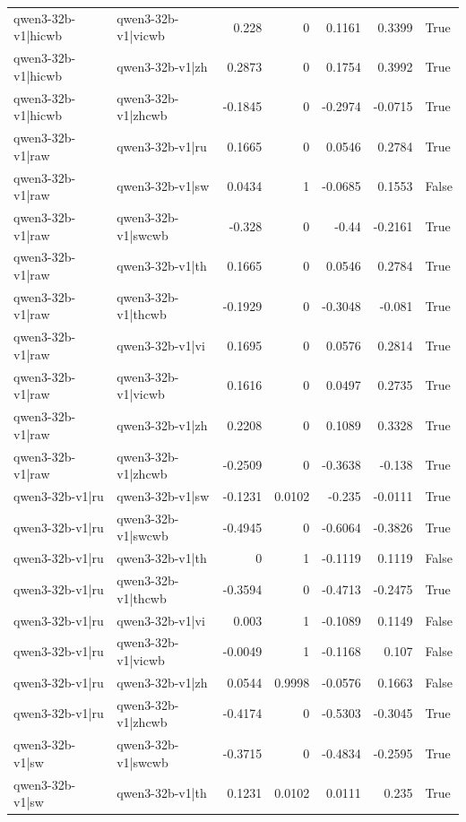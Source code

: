 \begin{table}
\begin{tabular}{l l r r r r l}
qwen3-32b-v1|hicwb & qwen3-32b-v1|vicwb & 0.228 & 0 & 0.1161 & 0.3399 & True \\
qwen3-32b-v1|hicwb & qwen3-32b-v1|zh & 0.2873 & 0 & 0.1754 & 0.3992 & True \\
qwen3-32b-v1|hicwb & qwen3-32b-v1|zhcwb & -0.1845 & 0 & -0.2974 & -0.0715 & True \\
qwen3-32b-v1|raw & qwen3-32b-v1|ru & 0.1665 & 0 & 0.0546 & 0.2784 & True \\
qwen3-32b-v1|raw & qwen3-32b-v1|sw & 0.0434 & 1 & -0.0685 & 0.1553 & False \\
qwen3-32b-v1|raw & qwen3-32b-v1|swcwb & -0.328 & 0 & -0.44 & -0.2161 & True \\
qwen3-32b-v1|raw & qwen3-32b-v1|th & 0.1665 & 0 & 0.0546 & 0.2784 & True \\
qwen3-32b-v1|raw & qwen3-32b-v1|thcwb & -0.1929 & 0 & -0.3048 & -0.081 & True \\
qwen3-32b-v1|raw & qwen3-32b-v1|vi & 0.1695 & 0 & 0.0576 & 0.2814 & True \\
qwen3-32b-v1|raw & qwen3-32b-v1|vicwb & 0.1616 & 0 & 0.0497 & 0.2735 & True \\
qwen3-32b-v1|raw & qwen3-32b-v1|zh & 0.2208 & 0 & 0.1089 & 0.3328 & True \\
qwen3-32b-v1|raw & qwen3-32b-v1|zhcwb & -0.2509 & 0 & -0.3638 & -0.138 & True \\
qwen3-32b-v1|ru & qwen3-32b-v1|sw & -0.1231 & 0.0102 & -0.235 & -0.0111 & True \\
qwen3-32b-v1|ru & qwen3-32b-v1|swcwb & -0.4945 & 0 & -0.6064 & -0.3826 & True \\
qwen3-32b-v1|ru & qwen3-32b-v1|th & 0 & 1 & -0.1119 & 0.1119 & False \\
qwen3-32b-v1|ru & qwen3-32b-v1|thcwb & -0.3594 & 0 & -0.4713 & -0.2475 & True \\
qwen3-32b-v1|ru & qwen3-32b-v1|vi & 0.003 & 1 & -0.1089 & 0.1149 & False \\
qwen3-32b-v1|ru & qwen3-32b-v1|vicwb & -0.0049 & 1 & -0.1168 & 0.107 & False \\
qwen3-32b-v1|ru & qwen3-32b-v1|zh & 0.0544 & 0.9998 & -0.0576 & 0.1663 & False \\
qwen3-32b-v1|ru & qwen3-32b-v1|zhcwb & -0.4174 & 0 & -0.5303 & -0.3045 & True \\
qwen3-32b-v1|sw & qwen3-32b-v1|swcwb & -0.3715 & 0 & -0.4834 & -0.2595 & True \\
qwen3-32b-v1|sw & qwen3-32b-v1|th & 0.1231 & 0.0102 & 0.0111 & 0.235 & True \\

\end{tabular}
\end{table}
